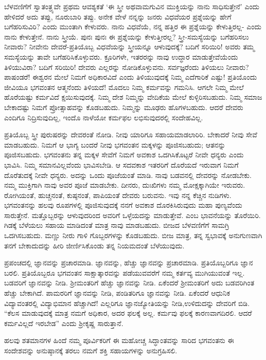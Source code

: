ಬೆಳವಣಿಗೆಗೆ ಸ್ವಾತಂತ್ರ್ಯವೇ ಪ್ರಥಮ ಆವಶ್ಯಕತೆ ‘ಈ ಸ್ತ್ರೀ ಅಥವಾ\break ಮಗುವಿನ ಮುಕ್ತಿಯನ್ನು ನಾನು ಸಾಧಿಸುತ್ತೇನೆ’ ಎಂದು ಹೇಳಿದರೆ ಅದು ತಪ್ಪು, ನೂರುಬಾರಿ ತಪ್ಪು. ಅನೇಕ ವೇಳೆ ನನ್ನನ್ನು ಜನರು ವಿಧವೆಯರ ಪ್ರಶ್ನೆಯನ್ನು ಹೇಗೆ ಬಗೆಹರಿಸುವಿರಿ? ಎಂದು ಮುಂತಾಗಿ ಕೇಳುವರು. ನಾನು ವಿಧವೆಯೆ, ನನ್ನ ಹತ್ತಿರ ಈ ಪ್ರಶ್ನೆಯನ್ನು ಕೇಳುತ್ತಿರಲ್ಲ- ಎಂದು ನಾನು ಕೇಳುತ್ತೇನೆ. ನಾನು ಸ್ತ್ರೀಯೆ. ಪುನಃ ಪುನಃ ಈ ಪ್ರಶ್ನೆಯನ್ನು ಕೇಳುತ್ತೀರಲ್ಲ? ಸ್ತ್ರೀ-ಸಮಸ್ಯೆಯನ್ನು ಬಗೆಹರಿಸಲು ನೀವಾರು? ನೀವೇನು ದೇವರೆ-ಪ್ರತಿಯೊಬ್ಬ ವಿಧವೆಯನ್ನು ಸ್ತ್ರೀಯನ್ನೂ ಆಳುವುದಕ್ಕೆ? ಬದಿಗೆ ಸರಿಯಿರಿ! ಅವರು ತಮ್ಮ ಸಮಸ್ಯೆಯನ್ನು ತಾವೇ ಬಗೆಹರಿಸಿಕೊಳ್ಳುವರು. ಕ್ರೂರಿಗಳೇ, ಇತರರನ್ನು ನಾವು ಉದ್ಧಾರ ಮಾಡುತ್ತೇವೆಯೆಂದು ತಿಳಿಯುವಿರಾ? ಬದಿಗೆ ಸರಿಯಿರಿ! ದೇವರು ಎಲ್ಲರನ್ನು ನೋಡಿಕೊಳ್ಳುವನು. ಸರ್ವಜ್ಞರೆಂದು ತಿಳಿಯಲು ನೀವಾರು? ಪಾಷಂಡರೆ! ಈಶ್ವರನ ಮೇಲೆ ನಿಮಗೆ ಅಧಿಕಾರವಿದೆ ಎಂದು ತಿಳಿಯುವುದಕ್ಕೆ ನಿಮ್ಮ ಎದೆಗಾರಿಕೆ ಎಷ್ಟು! ಪ್ರತಿಯೊಂದು ಜೀವಿಯೂ ಭಗವಂತನ ಆತ್ಮನೆಂದು ತಿಳಿಯದೆ! ಮೊದಲು ನಿಮ್ಮ ಕರ್ಮವನ್ನು ಗಮನಿಸಿ. ಆಗಲೇ ನಿಮ್ಮ ಮೇಲೆ ಹೊರೆಯಷ್ಟು ಕರ್ಮವಿದೆ ಕ್ಷಯಿಸುವುದಕ್ಕೆ. ನಿಮ್ಮ ದೇಶ ನಿಮ್ಮನ್ನು ವೇದಿಕೆಯ ಮೇಲೆ ಕುಳ್ಳಿರಿಸಬಹುದು. ನಿಮ್ಮ ಸಮಾಜ ಬೇಕಾದಷ್ಟು ನಿಮಗೆ ಪ್ರೋತ್ಸಾಹವನ್ನು ಕೊಡಬಹುದು. ನಿಮ್ಮನ್ನು ಮೂಢರು ಹೊಗಳಬಹುದು. ಆದರೆ ದೇವರು ಎಂದಿಗೂ ನಿದ್ರಿಸುವುದಿಲ್ಲ, ಇಂದೊ ನಾಳೆಯೋ ಕರ್ಮಫಲ ಲಭಿಸುವುದರಲ್ಲಿ ಸಂದೇಹವಿಲ್ಲ.

ಪ್ರತಿಯೊಬ್ಬ ಸ್ತ್ರೀ ಪುರುಷರನ್ನು ದೇವರಂತೆ ನೋಡಿ. ನೀವು ಯಾರಿಗೂ ಸಹಾಯಮಾಡಲಾರಿರಿ. ಬೇಕಾದರೆ ನೀವು ಸೇವೆ ಮಾಡಬಹುದು. ನಿಮಗೆ ಆ ಭಾಗ್ಯ ಬಂದರೆ ನೀವು ಭಗವಂತನ ಮಕ್ಕಳನ್ನು ಪೂಜಿಸಬಹುದು; ಆತನನ್ನು ಪೂಜಿಸಬಹುದು. ಭಗವಂತನು ತನ್ನ ಮಕ್ಕಳ ಸೇವೆಗೆ ನಿಮಗೆ ಅವಕಾಶ ಒದಗಿಸಿಕೊಟ್ಟರೆ ನೀವೇ ಧನ್ಯರು ಎಂದು ಭಾವಿಸಿ. ನಿಮ್ಮ ಸಮಾನವಿಲ್ಲವೆಂದು ಭಾವಿಸಬೇಡಿ. ಆ ಸದವಕಾಶ ಇತರರಿಗೆ ದೊರೆಯದೆ ಇರುವಾಗ ನಿಮಗೆ ದೊರೆತುದಕ್ಕೆ ನೀವೇ ಧನ್ಯರು. ಅದನ್ನು ಒಂದು ಪೂಜೆಯಂತೆ ಮಾಡಿ. ನಾವು ಬಡವನಲ್ಲಿ ದೇವರನ್ನು ನೋಡಬೇಕು. ನಮ್ಮ ಮುಕ್ತಿಗಾಗಿ ನಾವು ಅವರ ಪೂಜೆ ಮಾಡಬೇಕು. ದೀನರು, ದುಃಖಿಗಳು ನಮ್ಮ ಮೋಕ್ಷಕ್ಕಾಗಿಯೇ ಇರುವರು. ರೋಗಿಯಂತೆ, ಹುಚ್ಚನಂತೆ, ಕುಷ್ಠನಂತೆ, ಪಾಪಿಯಂತೆ ದೇವರು ಬರುವನು. ಇವು ನನ್ನ ಕೆಚ್ಚಿನ ನುಡಿಗಳು. ಭಗವಂತನನ್ನು ಹಲವು ರೂಪಗಳಲ್ಲಿ ಪೂಜಿಸುವುದಕ್ಕೆ ನನಗೆ ಅವಕಾಶ ದೊರಕಿಸಿರುವುದು ಮಹಾ ಪುಣ್ಯವೆಂದು ಸಾರುತ್ತೇನೆ. ಮತ್ತೊಬ್ಬರನ್ನು ಆಳುವುದರಿಂದ ಅವರಿಗೆ ಒಳ್ಳೆಯದನ್ನು ಮಾಡುತ್ತೇವೆ. ಎಂಬ ಭಾವನೆಯನ್ನು ತೊರೆಯಿರಿ. ಗಿಡಕ್ಕೆ ಬೆಳೆಯಲು ಸಹಾಯ ಮಾಡಿದಂತೆ ಮಾತ್ರ ನಾವು ಮಾಡಬಹುದು. ಬೀಜದ ಬೆಳವಣಿಗೆಗೆ ಸಾಮಗ್ರಿ ಒದಗಿಸಬಹುದು. ಮಣ್ಣು ನೀರು ಗಾಳಿ ಗೊಬ್ಬರಗಳನ್ನು ಕೊಡಬಹುದು. ಬೀಜ ಮಾತ್ರ, ತನ್ನ ಸ್ವಭಾವಕ್ಕೆ ಅನುಗುಣವಾಗಿ ತನಗೆ ಬೇಕಾದುದನ್ನು ಹೀರಿ ಜೀರ್ಣಿಸಿಕೊಂಡು ತನ್ನ ನಿಯಮದಂತೆ ಬೆಳೆಯುವುದು.

ಪ್ರಪಂಚದಲ್ಲಿ ಜ್ಞಾನವನ್ನು ಪ್ರಚಾರಮಾಡಿ. ಜ್ಞಾನವನ್ನು, ಹೆಚ್ಚು ಜ್ಞಾನವನ್ನು ಪ್ರಚಾರಮಾಡಿ. ಪ್ರತಿಯೊಬ್ಬರಿಗೂ ಜ್ಞಾನ ಬರಲಿ. ಪ್ರತಿಯೊಬ್ಬರೂ ಭಗವಂತನ ಸಾಕ್ಷಾತ್ಕಾರವನ್ನು ಪಡೆಯುವವರೆಗೆ ನಮ್ಮ ಕರ್ತವ್ಯ ಮುಗಿಯುವಂತೆ ಇಲ್ಲ. ಬಡವರಿಗೆ ಜ್ಞಾನವನ್ನು ನೀಡಿ. ಶ‍್ರೀಮಂತರಿಗೆ ಹೆಚ್ಚು ಜ್ಞಾನವನ್ನು ನೀಡಿ. ಏಕೆಂದರೆ ಶ‍್ರೀಮಂತರಿಗೆ ಅದು ಬಡವರಿಗಿಂತ ಹೆಚ್ಚು ಬೇಕಾಗಿದೆ. ಪಾಮರರಿಗೆ ಜ್ಞಾನವನ್ನು ನೀಡಿ, ಪಂಡಿತರಿಗೂ ಜ್ಞಾನವನ್ನು ನೀಡಿ. ಏಕೆಂದರೆ ಆಧುನಿಕ ವಿದ್ಯಾವಂತರಲ್ಲಿ ವಿದ್ಯಾಭಿಮಾನ ಹೆಚ್ಚಾಗಿದೆ! ಎಲ್ಲರಿಗೂ ಜ್ಞಾನಜ್ಯೋತಿಯನ್ನು ನೀಡಿ,\break ಉಳಿದುದನ್ನು ದೇವರಿಗೆ ಬಿಡಿ. “ಕೆಲಸ ಮಾಡುವುದಕ್ಕೆ ಮಾತ್ರ ನಮಗೆ ಅಧಿಕಾರ, ಅದರ ಫಲಕ್ಕೆ ಅಲ್ಲ. ಕರ್ಮವು ಫಲಕ್ಕೆ ಕಾರಣವಾಗದಿರಲಿ. ಆದರೆ ಕರ್ಮವಿಲ್ಲದೆ ಇರಬೇಡ” ಎಂದು ಶ‍್ರೀಕೃಷ್ಣ ಸಾರುತ್ತಾನೆ.

ಹಲವು ಶತಮಾನಗಳ ಹಿಂದೆ ನಮ್ಮ ಪೂರ್ವಿಕರಿಗೆ ಈ ಮಹೋಚ್ಚ ಸಿದ್ಧಾಂತವನ್ನು ಸಾರಿದ ಭಗವಂತನು ಈ ಸಂದೇಶವನ್ನು ಅನುಷ್ಠಾನಕ್ಕೆ ತರಲು ನಮಗೆ ಶಕ್ತಿ ಸಹಾಯಗಳನ್ನು ಅನುಗ್ರಹಿಸಲಿ.

